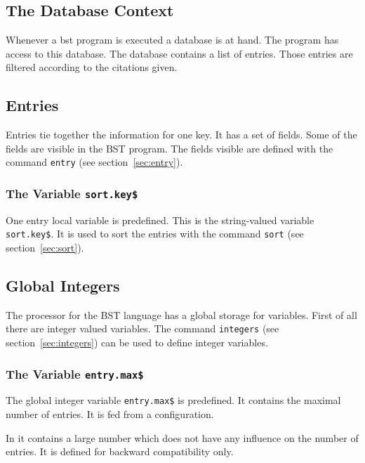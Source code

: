 \subsection{The Database Context}

Whenever a bst program is executed a database is at hand. The program
has access to this database. The database contains a list of entries.
Those entries are filtered according to the citations given.


\subsection{Entries}

Entries tie together the information for one key. It has a set of
fields. Some of the fields are visible in the BST program. The fields
visible are defined with the command \texttt{entry} (see
section~\ref{sec:entry}).


\subsubsection{The Variable \texttt{sort.key\$}}%

One entry local variable is predefined. This is the string-valued
variable \texttt{sort.key\$}. It is used to sort the entries with the
command \texttt{sort} (see section~\ref{sec:sort}).


\subsection{Global Integers}

The processor for the BST language has a global storage for variables.
First of all there are integer valued variables. The command
\texttt{integers} (see section~\ref{sec:integers}) can be used to
define integer variables.


\subsubsection{The Variable \texttt{entry.max\$}}%

The global integer variable \texttt{entry.max\$} is predefined. It
contains the maximal number of entries. It is fed from a
configuration.

In \ExBib{} it contains a large number which does
not have any influence on the number of entries. It is defined for
backward compatibility only.

